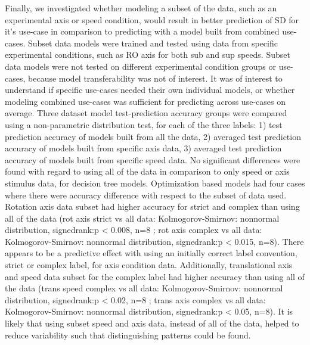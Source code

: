 \documentclass[11pt, onecolumn]{article}
\begin{document}
Finally, we investigated whether modeling a subset of the data, such as an experimental axis or speed condition, would result in better prediction of SD for it’s use-case in comparison to predicting with a model built from combined use-cases.  Subset data models were trained and tested using data from specific experimental conditions, such as RO axis for both sub and sup speeds.  Subset data models were not tested on different experimental condition groups or use-cases, because model transferability was not of interest.  It was of interest to understand if specific use-cases needed their own individual models, or whether modeling combined use-cases was sufficient for predicting across use-cases on average.  Three dataset model test-prediction accuracy groups were compared using a non-parametric distribution test, for each of the three labels:  1) test prediction accuracy of models built from all the data, 2) averaged test prediction accuracy of models built from specific axis data, 3) averaged test prediction accuracy of models built from specific speed data.  No significant differences were found with regard to using all of the data in comparison to only speed or axis stimulus data, for decision tree models.  Optimization based models had four cases where there were accuracy difference with respect to the subset of data used.  Rotation axis data subset had higher accuracy for strict and complex than using all of the data (rot axis strict vs all data: Kolmogorov-Smirnov: nonnormal distribution, signedrank:p < 0.008, n=8 ; rot axis complex vs all data: Kolmogorov-Smirnov: nonnormal distribution, signedrank:p < 0.015, n=8).  There appears to be a predictive effect with using an initially correct label convention, strict or complex label, for axis condition data. Additionally, translational axis and speed data subset for the complex label had higher accuracy than using all of the data (trans speed complex vs all data: Kolmogorov-Smirnov: nonnormal distribution, signedrank:p < 0.02, n=8 ; trans axis complex vs all data: Kolmogorov-Smirnov: nonnormal distribution, signedrank:p < 0.05, n=8).  It is likely that using subset speed and axis data, instead of all of the data, helped to reduce variability such that distinguishing patterns could be found.
\end{document}
